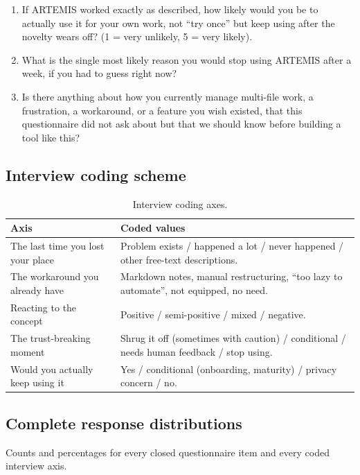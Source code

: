 \documentclass[11pt]{article}
\begin{document}
\begin{enumerate}
        choose?
  \item If ARTEMIS worked exactly as described, how likely would you be to actually use it for
        your own work, not \enquote{try once} but keep using after the novelty wears off?
        (1 = very unlikely, 5 = very likely).
  \item What is the single most likely reason you would stop using ARTEMIS after a week, if you
        had to guess right now?
  \item Is there anything about how you currently manage multi-file work, a frustration, a
        workaround, or a feature you wish existed, that this questionnaire did not ask about but
        that we should know before building a tool like this?
\end{enumerate}

\subsection{Interview coding scheme}
\begin{table}[H]
\centering
\caption{Interview coding axes.}
\begin{tabular}{@{}>{\raggedright\arraybackslash}p{3.6cm}>{\raggedright\arraybackslash}p{10.3cm}@{}}
\toprule
Axis & Coded values \\
\midrule
The last time you lost your place & Problem exists / happened a lot / never happened / other free-text descriptions. \\
The workaround you already have & Markdown notes, manual restructuring, \enquote{too lazy to automate}, not equipped, no need. \\
Reacting to the concept & Positive / semi-positive / mixed / negative. \\
The trust-breaking moment & Shrug it off (sometimes with caution) / conditional / needs human feedback / stop using. \\
Would you actually keep using it & Yes / conditional (onboarding, maturity) / privacy concern / no. \\
\bottomrule
\end{tabular}
\end{table}

\subsection{Complete response distributions}

Counts and percentages for every closed questionnaire item and every coded interview axis.


\end{document}
